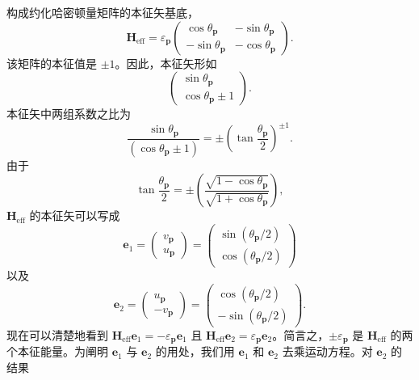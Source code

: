 构成约化哈密顿量矩阵的本征矢基底，
\begin{equation*}
\mathbf{H}_{\mathrm{eff}}=\varepsilon_{\mathbf{p}}\begin{pmatrix}\cos\theta_{\mathbf{p}} & -\sin\theta_{\mathbf{p}}\\ -\sin\theta_{\mathbf{p}} & -\cos\theta_{\mathbf{p}}\end{pmatrix}.\tag{12.234}
\end{equation*}
该矩阵的本征值是 $\pm 1$。因此，本征矢形如
\begin{equation*}
\begin{pmatrix}\sin\theta_{\mathbf{p}}\\ \cos\theta_{\mathbf{p}}\pm 1\end{pmatrix}.\tag{12.235}
\end{equation*}
本征矢中两组系数之比为
\begin{equation*}
\frac{\sin\theta_{\mathbf{p}}}{(\cos\theta_{\mathbf{p}}\pm 1)}=\pm\left(\tan\frac{\theta_{\mathbf{p}}}{2}\right)^{\pm 1}.\tag{12.236}
\end{equation*}
由于
\begin{equation*}
\tan\frac{\theta_{\mathbf{p}}}{2}=\pm\left(\frac{\sqrt{1-\cos\theta_{\mathbf{p}}}}{\sqrt{1+\cos\theta_{\mathbf{p}}}}\right),\tag{12.237}
\end{equation*}
$\mathbf{H}_{\mathrm{eff}}$ 的本征矢可以写成
\begin{equation*}
\mathbf{e}_{1}=\begin{pmatrix}v_{\mathbf{p}}\\ u_{\mathbf{p}}\end{pmatrix}=\begin{pmatrix}\sin\left(\theta_{\mathbf{p}}/2\right)\\ \cos\left(\theta_{\mathbf{p}}/2\right)\end{pmatrix}\tag{12.238}
\end{equation*}
以及
\begin{equation*}
\mathbf{e}_{2}=\begin{pmatrix}u_{\mathbf{p}}\\ -v_{\mathbf{p}}\end{pmatrix}=\begin{pmatrix}\cos\left(\theta_{\mathbf{p}}/2\right)\\ -\sin\left(\theta_{\mathbf{p}}/2\right)\end{pmatrix}.\tag{12.239}
\end{equation*}
现在可以清楚地看到 $\mathbf{H}_{\mathrm{eff}}\mathbf{e}_{1}=-\varepsilon_{\mathbf{p}}\mathbf{e}_{1}$ 且 $\mathbf{H}_{\mathrm{eff}}\mathbf{e}_{2}=\varepsilon_{\mathbf{p}}\mathbf{e}_{2}$。简言之，$\pm\varepsilon_{\mathbf{p}}$ 是 $\mathbf{H}_{\mathrm{eff}}$ 的两个本征能量。为阐明 $\mathbf{e}_{1}$ 与 $\mathbf{e}_{2}$ 的用处，我们用 $\mathbf{e}_{1}$ 和 $\mathbf{e}_{2}$ 去乘运动方程。对 $\mathbf{e}_{2}$ 的结果
